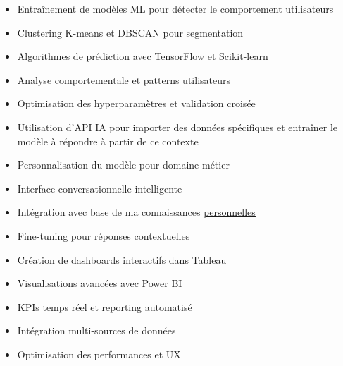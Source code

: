 \documentclass[10pt,a4paper,normalphoto]{altacv}
\begin{document}
\clearpage


\begin{itemize}
\item Entraînement de modèles ML pour détecter le comportement utilisateurs
\item Clustering K-means et DBSCAN pour segmentation
\item Algorithmes de prédiction avec TensorFlow et Scikit-learn
\item Analyse comportementale et patterns utilisateurs
\item Optimisation des hyperparamètres et validation croisée
\end{itemize}

\divider

\begin{itemize}
\item Utilisation d'API IA pour importer des données spécifiques et entraîner le modèle à répondre à partir de ce contexte
\item Personnalisation du modèle pour domaine métier
\item Interface conversationnelle intelligente
\item Intégration avec base de ma connaissances \href{https://anas.itssghir.com}{\uline{personnelles}}
\item Fine-tuning pour réponses contextuelles
\end{itemize}

\divider

\begin{itemize}
\item Création de dashboards interactifs dans Tableau
\item Visualisations avancées avec Power BI
\item KPIs temps réel et reporting automatisé
\item Intégration multi-sources de données
\item Optimisation des performances et UX
\end{itemize}

\divider
\end{document}
